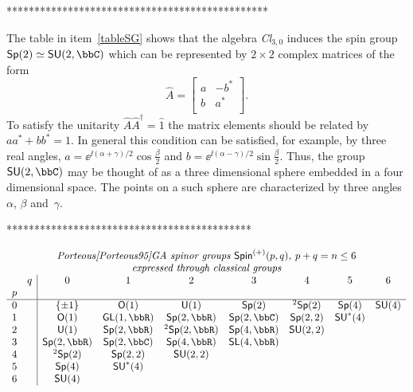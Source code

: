 ***********************************************


\begin{example} The table in item~\ref{tableSG} shows that the
algebra \textit{Cl}$_{3,0}$ induces the spin group
$\mathsf{Sp}(2)\simeq \mathsf{SU}(2,\bbC)$ which can be
represented by $2\times 2$ complex matrices of the form
\[\hat{A}=\left[
\begin{array}{cc}
a&-b^*\\
b& a^*\\
\end{array} \right].\]
To satisfy the unitarity $\hat{A}\hat{A}^{\dagger}=\hat{1}$ the
matrix elements should be related by $aa^*+bb^*=1$. In general
this condition can be satisfied, for example,  by three real
angles, $a=\ee^{\ii(\alpha+\gamma)/2}\cos\frac{\beta}{2}$ and
$b=\ee^{\ii(\alpha-\gamma)/2}\sin\frac{\beta}{2}$. Thus, the group
$\mathsf{SU}(2,\bbC)$ may be thought of as a three
dimensional sphere embedded in a four dimensional space. The
points on a such sphere are characterized by three angles
$\alpha$, $\beta$ and~$\gamma$.
\end{example}

********************************************

$$\begin{array}{cc|ccccccc}
\multicolumn{9}{c}{\textit{Porteous\cite{Porteous95}GA spinor
groups $\mathsf{Spin}^{(+)}(p,q)$,
$p+q=n\le 6$}}\\
\multicolumn{9}{c}{\textit{expressed through classical groups}}\\
 &q&0&1&2&3&4&5&6\\
 p& &&&&&&&\\ \hline
 0& &\{\pm 1\}&\mathsf{O}(1)&\mathsf{U}(1)&\mathsf{Sp}(2)&^2\mathsf{Sp}(2)&\mathsf{Sp}(4)&\mathsf{SU}(4)\\
 1& &\mathsf{O}(1)&\mathsf{GL}(1,\bbR)&\mathsf{Sp}(2,\bbR)&\mathsf{Sp}(2,\bbC)&\mathsf{Sp}(2,2)&\mathsf{SU}^*(4)&\\
 2& &\mathsf{U}(1)&\mathsf{Sp}(2,\bbR)&^2\mathsf{Sp}(2,\bbR)&\mathsf{Sp}(4,\bbR)&\mathsf{SU}(2,2)&&\\
 3& &\mathsf{Sp}(2,\bbR)&\mathsf{Sp}(2,\bbC)&\mathsf{Sp}(4,\bbR)&\mathsf{SL}(4,\bbR)&&&\\
 4& &^2\mathsf{Sp}(2)&\mathsf{Sp}(2,2)&\mathsf{SU}(2,2)&&&&\\
 5& &\mathsf{Sp}(4)&\mathsf{SU}^*(4)&&&&&\\
 6& &\mathsf{SU}(4)&&&&&&\\
\end{array}$$

